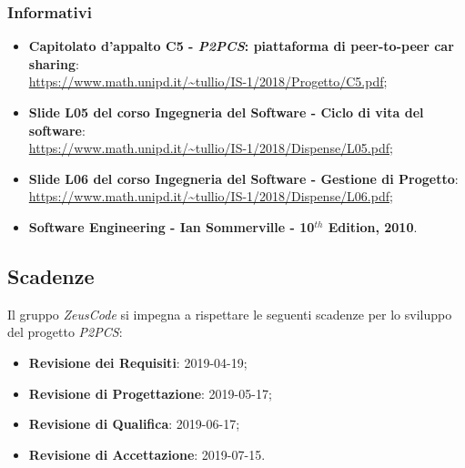 \subsubsection{Informativi}
\begin{itemize}
	\item \textbf{Capitolato d'appalto C5 - \textit{P2PCS}: piattaforma di peer-to-peer car sharing}: \\
	\url{https://www.math.unipd.it/~tullio/IS-1/2018/Progetto/C5.pdf};
	\item \textbf{Slide L05 del corso Ingegneria del Software - Ciclo di vita 
		del software}:\\
	\url{https://www.math.unipd.it/~tullio/IS-1/2018/Dispense/L05.pdf};
	\item \textbf{Slide L06 del corso Ingegneria del Software - Gestione di 
	Progetto}: \\
	\url{https://www.math.unipd.it/~tullio/IS-1/2018/Dispense/L06.pdf};
	\item \textbf{Software Engineering - Ian Sommerville - 10$^{th}$ Edition, 
	2010}.
\end{itemize}

\hypertarget{scadenze}{\subsection{Scadenze}}
Il gruppo \textit{ZeusCode} si impegna a rispettare le seguenti scadenze per lo 
sviluppo del progetto \textit{P2PCS}:

\begin{itemize}
	\item \textbf{Revisione dei Requisiti}: 2019-04-19;
	\item \textbf{Revisione di Progettazione}: 2019-05-17;
	\item \textbf{Revisione di Qualifica}: 2019-06-17;
	\item \textbf{Revisione di Accettazione}: 2019-07-15.
\end{itemize}